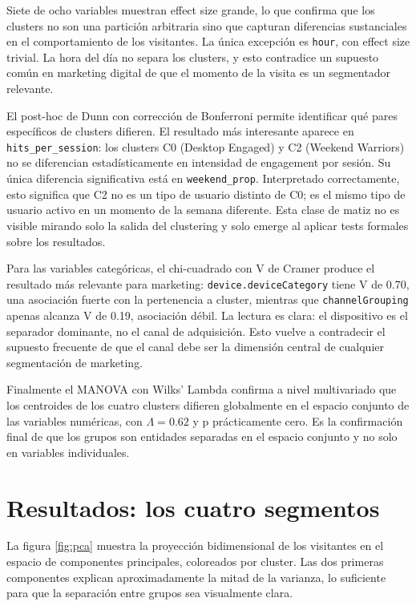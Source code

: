 \documentclass[11pt,a4paper]{article}
\begin{document}
Siete de ocho variables muestran effect size grande, lo que confirma que los
clusters no son una partición arbitraria sino que capturan diferencias
sustanciales en el comportamiento de los visitantes. La única excepción es
\texttt{hour}, con effect size trivial. La hora del día no separa los clusters,
y esto contradice un supuesto común en marketing digital de que el momento de
la visita es un segmentador relevante.

El post-hoc de Dunn con corrección de Bonferroni permite identificar qué pares
específicos de clusters difieren. El resultado más interesante aparece en
\texttt{hits\_per\_session}: los clusters C0 (Desktop Engaged) y C2 (Weekend
Warriors) no se diferencian estadísticamente en intensidad de engagement por
sesión. Su única diferencia significativa está en \texttt{weekend\_prop}.
Interpretado correctamente, esto significa que C2 no es un tipo de usuario
distinto de C0; es el mismo tipo de usuario activo en un momento de la semana
diferente. Esta clase de matiz no es visible mirando solo la salida del
clustering y solo emerge al aplicar tests formales sobre los resultados.

Para las variables categóricas, el chi-cuadrado con V de Cramer produce el
resultado más relevante para marketing: \texttt{device.deviceCategory} tiene V
de 0.70, una asociación fuerte con la pertenencia a cluster, mientras que
\texttt{channelGrouping} apenas alcanza V de 0.19, asociación débil. La lectura
es clara: el dispositivo es el separador dominante, no el canal de adquisición.
Esto vuelve a contradecir el supuesto frecuente de que el canal debe ser la
dimensión central de cualquier segmentación de marketing.

Finalmente el MANOVA con Wilks' Lambda confirma a nivel multivariado que los
centroides de los cuatro clusters difieren globalmente en el espacio conjunto
de las variables numéricas, con $\Lambda = 0.62$ y p prácticamente cero. Es la
confirmación final de que los grupos son entidades separadas en el espacio
conjunto y no solo en variables individuales.

\section{Resultados: los cuatro segmentos}

La figura \ref{fig:pca} muestra la proyección bidimensional de los visitantes
en el espacio de componentes principales, coloreados por cluster. Las dos
primeras componentes explican aproximadamente la mitad de la varianza, lo
suficiente para que la separación entre grupos sea visualmente clara.
\end{document}
